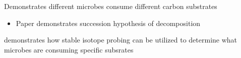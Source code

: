 
Demonstrates different microbes consume different carbon substrates
\begin{itemize}
\item Paper demonstrates succession hypothesis of decomposition
\end{itemize}demonstrates how stable isotope probing can be utilized to determine what microbes are consuming specific subsrates


